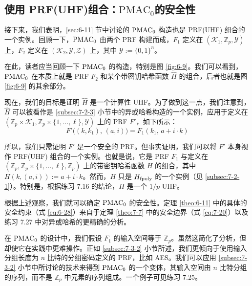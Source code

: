 \subsection{使用 PRF(UHF)组合：$\mathrm{PMAC}_0$的安全性}\label{subsec:7-3-3}

接下来，我们表明，\ref{sec:6-11} 节中讨论的 $\rm PMAC_0$ 构造也是 PRF(UHF) 组合的一个实例。回顾一下，$\rm PMAC_0$ 由两个 PRF 构建而成，$F_1$ 定义在 $(\mathcal{K}_1,\mathbb{Z}_p,\mathcal{Y})$ 上，$F_2$ 定义在 $(\mathcal{K}_2,\mathcal{Y},\mathcal{Z})$ 上，其中 $\mathcal{Y}:=\{0,1\}^n$。

在此，读者应当回顾一下 $\rm PMAC_0$ 的构造，特别是图 \ref{fig:6-9}。我们可以看到，$\rm PMAC_0$ 在本质上就是 PRF $F_2$ 和某个带密钥哈希函数 $\widehat{H}$ 的组合，后者也就是图 \ref{fig:6-9} 的其余部分。

现在，我们的目标是证明 $\widehat{H}$ 是一个计算性 UHF。为了做到这一点，我们注意到，$\widehat{H}$ 可以被看作是 \ref{subsec:7-2-3} 小节中的异或哈希构造的一个实例，应用于定义在 $(\mathbb{Z}_p\times\mathcal{K}_1,\mathbb{Z}_p\times\{1,\dots,\ell\},\mathcal{Y})$ 上的 PRF $F'$，如下所示：
\[
F'\big((k,k_1),\,(a,i)\big)=F_1(k_1,\,a+i\cdot k)
\]

所以，我们只需证明 $F'$ 是一个安全的 PRF。但事实证明，我们可以将 $F'$ 本身视作 PRF(UHF) 组合的一个实例。也就是说，它是 PRF $F_1$ 与定义在 $(\mathbb{Z}_p,\mathbb{Z}_p\times\{1,\dots,\ell\},\mathbb{Z}_p)$ 上的带密钥哈希函数 $H$ 的组合，其中$H(k,(a,i)):=a+i\cdot k$。然而，$H$ 只是 $H_{\rm fpoly}$ 的一个实例（见 \ref{subsec:7-2-1}）。特别是，根据练习 7.16 的结论，$H$ 是一个 ${1}/{p}$-UHF。

根据上述观察，我们就可以确定 $\rm PMAC_0$ 的安全性。定理 \ref{theo:6-11} 中的具体的安全约束（式 \ref{eq:6-28}）来自于定理 \ref{theo:7-7} 中的安全边界（式 \ref{eq:7-20}）以及练习 7.27 中对异或哈希的更精确的分析。

在 $\rm PMAC_0$ 的设计中，我们假设 $F_1$ 的输入空间等于 $\mathbb{Z}_p$。虽然这简化了分析，但却使它在实践中更难操作。正如 \ref{subsec:7-3-2} 小节所述，我们更倾向于使用输入分组长度为 $n$ 比特的分组密码定义的 PRF，比如 AES。我们可以应用 \ref{subsec:7-3-2} 小节中所讨论的技术来得到 $\rm PMAC_0$ 的一个变体，其输入空间由 $n$ 比特分组的序列，而不是 $\mathbb{Z}_p$ 中元素的序列组成。一个例子可见练习 7.25。